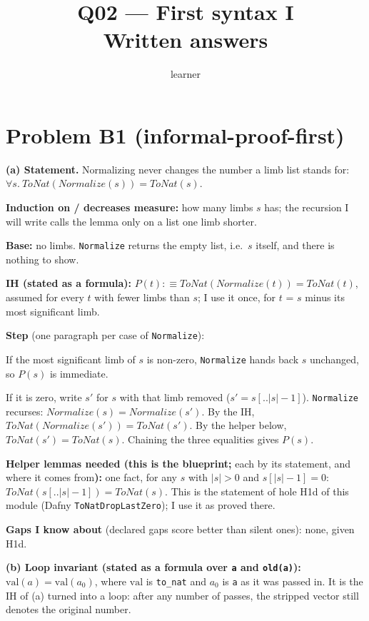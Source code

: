 \documentclass[11pt]{article}
\title{Q02 --- First syntax I \\ \large Written answers}
\author{learner}
\date{}
\begin{document}
\maketitle

\section*{Problem B1 (informal-proof-first)}\label{ans:B1}
\begin{answer}
\textbf{(a) Statement.} Normalizing never changes the number a limb list
stands for: $\forall s.\ \mathit{ToNat}(\mathit{Normalize}(s)) =
\mathit{ToNat}(s)$.

\textbf{Induction on / decreases measure:} how many limbs $s$ has; the
recursion I will write calls the lemma only on a list one limb shorter.

\textbf{Base:} no limbs. \texttt{Normalize} returns the empty list, i.e.\ $s$
itself, and there is nothing to show.

\textbf{IH (stated as a formula):} $P(t) :\equiv
\mathit{ToNat}(\mathit{Normalize}(t)) = \mathit{ToNat}(t)$, assumed for every
$t$ with fewer limbs than $s$; I use it once, for $t$ = $s$ minus its most
significant limb.

\textbf{Step} (one paragraph per case of \texttt{Normalize}):

If the most significant limb of $s$ is non-zero, \texttt{Normalize} hands back
$s$ unchanged, so $P(s)$ is immediate.

If it is zero, write $s'$ for $s$ with that limb removed ($s' = s[..|s|-1]$).
\texttt{Normalize} recurses: $\mathit{Normalize}(s) = \mathit{Normalize}(s')$.
By the IH, $\mathit{ToNat}(\mathit{Normalize}(s')) = \mathit{ToNat}(s')$. By the
helper below, $\mathit{ToNat}(s') = \mathit{ToNat}(s)$. Chaining the three
equalities gives $P(s)$.

\textbf{Helper lemmas needed (this is the blueprint;} each by its statement,
and where it comes from\textbf{):} one fact, for any $s$ with $|s| > 0$ and
$s[|s|-1] = 0$: $\mathit{ToNat}(s[..|s|-1]) = \mathit{ToNat}(s)$. This is the
statement of hole H1d of this module (Dafny \texttt{ToNatDropLastZero}); I use
it as proved there.

\textbf{Gaps I know about} (declared gaps score better than silent ones): none,
given H1d.

\textbf{(b) Loop invariant (stated as a formula over \texttt{a} and
\texttt{old(a)}):} $\mathrm{val}(a) = \mathrm{val}(a_0)$, where
$\mathrm{val}$ is \texttt{to\_nat} and $a_0$ is \texttt{a} as it was passed in.
It is the IH of (a) turned into a loop: after any number of passes, the stripped
vector still denotes the original number.


\end{answer}
\end{document}
